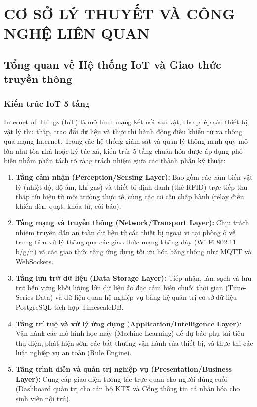 \chapter{CƠ SỞ LÝ THUYẾT VÀ CÔNG NGHỆ LIÊN QUAN}
\label{ch:chuong2}

\section{Tổng quan về Hệ thống IoT và Giao thức truyền thông}
\label{sec:tong_quan_iot}

\subsection{Kiến trúc IoT 5 tầng}
Internet of Things (IoT) là mô hình mạng kết nối vạn vật, cho phép các thiết bị vật lý thu thập, trao đổi dữ liệu và thực thi hành động điều khiển từ xa thông qua mạng Internet. Trong các hệ thống giám sát và quản lý thông minh quy mô lớn như tòa nhà hoặc ký túc xá, kiến trúc 5 tầng chuẩn hóa được áp dụng phổ biến nhằm phân tách rõ ràng trách nhiệm giữa các thành phần kỹ thuật:

\begin{enumerate}
    \item \textbf{Tầng cảm nhận (Perception/Sensing Layer):} Bao gồm các cảm biến vật lý (nhiệt độ, độ ẩm, khí gas) và thiết bị định danh (thẻ RFID) trực tiếp thu thập tín hiệu từ môi trường thực tế, cùng các cơ cấu chấp hành (relay điều khiển đèn, quạt, khóa từ, còi báo).
    \item \textbf{Tầng mạng và truyền thông (Network/Transport Layer):} Chịu trách nhiệm truyền dẫn an toàn dữ liệu từ các thiết bị ngoại vi tại phòng ở về trung tâm xử lý thông qua các giao thức mạng không dây (Wi-Fi 802.11 b/g/n) và các giao thức tầng ứng dụng tối ưu hóa băng thông như MQTT và WebSockets.
    \item \textbf{Tầng lưu trữ dữ liệu (Data Storage Layer):} Tiếp nhận, làm sạch và lưu trữ bền vững khối lượng lớn dữ liệu đo đạc cảm biến chuỗi thời gian (Time-Series Data) và dữ liệu quan hệ nghiệp vụ bằng hệ quản trị cơ sở dữ liệu PostgreSQL tích hợp TimescaleDB.
    \item \textbf{Tầng trí tuệ và xử lý ứng dụng (Application/Intelligence Layer):} Vận hành các mô hình học máy (Machine Learning) để dự báo phụ tải tiêu thụ điện, phát hiện sớm các bất thường vận hành của thiết bị, và thực thi các luật nghiệp vụ an toàn (Rule Engine).
    \item \textbf{Tầng trình diễn và quản trị nghiệp vụ (Presentation/Business Layer):} Cung cấp giao diện tương tác trực quan cho người dùng cuối (Dashboard quản trị cho cán bộ KTX và Cổng thông tin cá nhân hóa cho sinh viên nội trú).
\end{enumerate}

